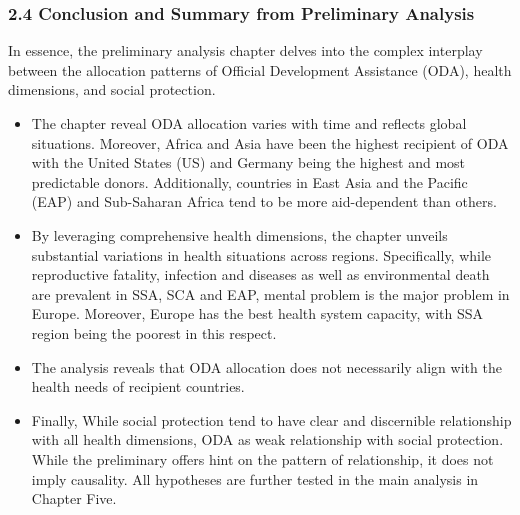 \subsubsection*{2.4  Conclusion and Summary from Preliminary Analysis}
In essence, the preliminary analysis chapter delves into the complex interplay between the allocation patterns of Official Development Assistance (ODA), health dimensions, and social protection.

\begin{itemize}
    \item The chapter reveal ODA allocation varies with time and reflects global situations. Moreover, Africa and Asia have been the highest recipient of ODA with the United States (US) and Germany being the highest and most predictable donors. Additionally, countries in East Asia and the Pacific (EAP) and Sub-Saharan Africa tend to be more aid-dependent than others. 
    \item By leveraging comprehensive health dimensions, the chapter unveils substantial variations in health situations across regions. Specifically, while reproductive fatality, infection and diseases as well as environmental death are prevalent in SSA, SCA and EAP, mental problem is the major problem in Europe. Moreover, Europe has the best health system capacity, with SSA region being the poorest in this respect. 
    \item The analysis reveals that ODA allocation does not necessarily align with the health needs of recipient countries. 
    \item Finally, While social protection tend to have clear and discernible relationship with all health dimensions, ODA as weak relationship with social protection. While the preliminary offers hint on the pattern of relationship, it does not imply causality. All hypotheses are further tested in the main analysis in Chapter Five. 
\end{itemize}
    


